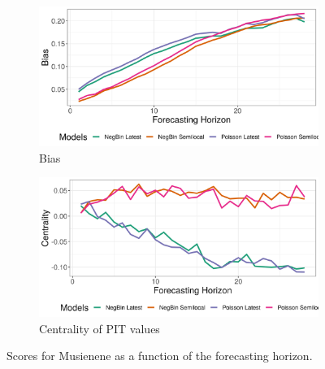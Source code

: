 \begin{figure}[H]
\begin{subfigure}{0.5\textwidth}
  \centering
  \includegraphics[width=\linewidth]{../output/Musienene_bias.png}  
  \caption{Bias}
  \label{fig:Musienene_scores_3}
\end{subfigure}
\begin{subfigure}{0.5\textwidth}
  \centering
  \includegraphics[width=\linewidth]{../output/Musienene_centrality.png}  
  \caption{Centrality of PIT values}
  \label{fig:Musienene_scores_4}
\end{subfigure}
  \caption{Scores for Musienene as a function of the forecasting horizon.}

  \label{fig:nat_scores}
\end{figure}
